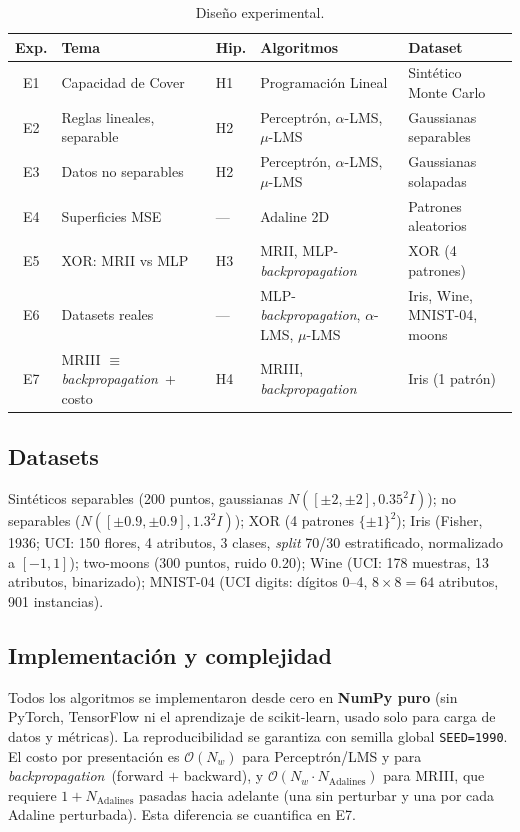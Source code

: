 \documentclass[11pt,a4paper]{article}
\newcommand{\aLMS}{$\alpha$-LMS}
\newcommand{\muLMS}{$\mu$-LMS}
\newcommand{\bp}{\textit{backpropagation}}
\begin{document}
\begin{table}[htbp]\centering\footnotesize
\begin{tabular}{@{}clllp{3.2cm}@{}}
\toprule
\textbf{Exp.} & \textbf{Tema} & \textbf{Hip.} & \textbf{Algoritmos} & \textbf{Dataset} \\
\midrule
E1 & Capacidad de Cover & H1 & Programaci\'on Lineal & Sint\'etico Monte Carlo \\
E2 & Reglas lineales, separable & H2 & Perceptr\'on, \aLMS, \muLMS & Gaussianas separables \\
E3 & Datos no separables & H2 & Perceptr\'on, \aLMS, \muLMS & Gaussianas solapadas \\
E4 & Superficies MSE & --- & Adaline 2D & Patrones aleatorios \\
E5 & XOR: MRII vs MLP & H3 & MRII, MLP-\bp & XOR (4 patrones) \\
E6 & Datasets reales & --- & MLP-\bp, \aLMS, \muLMS & Iris, Wine, MNIST-04, moons \\
E7 & MRIII $\equiv$ \bp~+ costo & H4 & MRIII, \bp & Iris (1 patr\'on) \\
\bottomrule
\end{tabular}
\caption{Diseño experimental.}\label{tab:diseno}
\end{table}

\subsection{Datasets}

Sintéticos separables (200 puntos, gaussianas $N([\pm2,\pm2], 0.35^2I)$); no separables
($N([\pm0.9,\pm0.9], 1.3^2I)$); XOR (4 patrones $\{\pm1\}^2$); Iris (Fisher, 1936; UCI: 150
flores, 4 atributos, 3 clases, \textit{split} 70/30 estratificado, normalizado a $[-1,1]$);
two-moons (300 puntos, ruido 0.20); Wine (UCI: 178 muestras, 13 atributos, binarizado); MNIST-04
(UCI digits: dígitos 0--4, $8\times8=64$ atributos, 901 instancias).

\subsection{Implementación y complejidad}

Todos los algoritmos se implementaron desde cero en \textbf{NumPy puro} (sin PyTorch, TensorFlow ni
el aprendizaje de scikit-learn, usado solo para carga de datos y métricas). La reproducibilidad se
garantiza con semilla global \texttt{SEED=1990}. El costo por presentación es $\mathcal{O}(N_w)$
para Perceptrón/LMS y para \bp~(forward $+$ backward), y $\mathcal{O}(N_w \cdot N_{\text{Adalines}})$
para MRIII, que requiere $1 + N_{\text{Adalines}}$ pasadas hacia adelante (una sin perturbar y una
por cada Adaline perturbada). Esta diferencia se cuantifica en E7.
\end{document}
